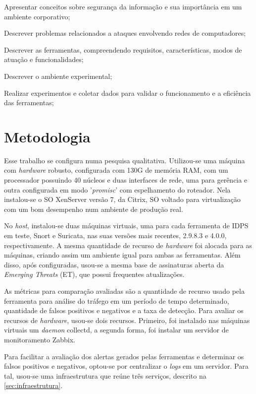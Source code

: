\begin{alineas}
\item Apresentar conceitos sobre segurança da informação e sua importância em um ambiente corporativo;
\item Descrever problemas relacionados a ataques envolvendo redes de computadores;
\item Descrever as ferramentas, compreendendo requisitos, características, modos de atuação e funcionalidades;
\item Descrever o ambiente experimental;
\item Realizar experimentos e coletar dados para validar o funcionamento e a eficiência das ferramentas;
\end{alineas}

\section{Metodologia} \label{sec:metodologia}

Esse trabalho se configura numa pesquisa qualitativa. Utilizou-se uma máquina com \textit{hardware} robusto, configurada com 130G de memória RAM, com um processador possuindo 40 núcleos e duas interfaces de rede, uma para gerência e outra configurada em modo '\textit{promisc}' com espelhamento do roteador. Nela instalou-se o SO XenServer versão 7, da Citrix, SO voltado para virtualização com um bom desempenho num ambiente de produção real. 

No \textit{host}, instalou-se duas máquinas virtuais, uma para cada ferramenta de IDPS em teste, Snort e Suricata, nas suas versões mais recentes, 2.9.8.3 e 4.0.0, respectivamente. A mesma quantidade de recurso de \textit{hardware} foi alocada para as máquinas, criando assim um ambiente igual para ambas as ferramentas. Além disso, após configuradas, usou-se a mesma base de assinaturas aberta da \textit{Emerging Threats} (ET), que possui frequentes atualizações.

As métricas para comparação avaliadas são a quantidade de recurso usado pela ferramenta para análise do tráfego em um período de tempo determinado, quantidade de falsos positivos e negativos e a taxa de detecção. Para avaliar os recursos de \textit{hardware}, usou-se dois recursos. Primeiro, foi instalado nas máquinas virtuais um \textit{daemon} collectd, a segunda forma, foi instalar um servidor de monitoramento Zabbix. 

Para facilitar a avaliação dos alertas gerados pelas ferramentas e determinar os falsos positivos e negativos, optou-se por centralizar o \textit{logs} em um servidor. Para tal, usou-se uma infraestrutura que reúne três serviços, descrito na \autoref{sec:infraestrutura}.

